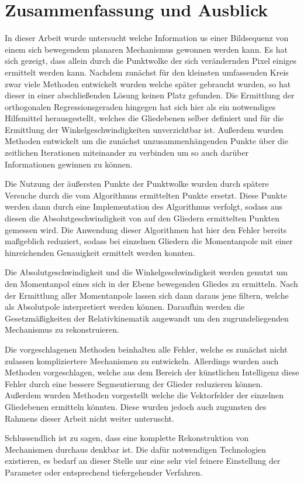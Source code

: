 
\chapter{Zusammenfassung und Ausblick} \label{ch:zusammenfassung_ausblick}


In dieser Arbeit wurde untersucht welche Information us einer Bildsequenz von einem sich bewegendem planaren Mechanismus gewonnen werden kann.
Es hat sich gezeigt, dass allein durch die Punktwolke der sich verändernden Pixel einiges ermittelt werden kann.
Nachdem zunächst für den kleinsten umfassenden Kreis zwar viele Methoden entwickelt wurden welche später gebraucht wurden, so hat dieser in einer abschlie{\ss}enden Lösung keinen Platz gefunden.
Die Ermittlung der orthogonalen Regressionsgeraden hingegen hat sich hier als ein notwendiges Hilfsmittel herausgestellt, welches die Gliedebenen selber definiert und für die Ermittlung der Winkelgeschwindigkeiten unverzichtbar ist.
Au{\ss}erdem wurden Methoden entwickelt um die zunächst unzusammenhängenden Punkte über die zeitlichen Iterationen miteinander zu verbinden um so auch darüber Informationen gewinnen zu können.

Die Nutzung der äu{\ss}ersten Punkte der Punktwolke wurden durch spätere Versuche durch die vom  Algorithmus ermittelten Punkte ersetzt.
Diese Punkte werden dann durch eine Implementation des  Algorithmus verfolgt, sodass aus diesen die Absolutgeschwindigkeit von auf den Gliedern ermittelten Punkten gemessen wird.
Die Anwendung dieser Algorithmen hat hier den Fehler bereits ma{\ss}geblich reduziert, sodass bei einzelnen Gliedern die Momentanpole mit einer hinreichenden Genauigkeit ermittelt werden konnten.

Die Absolutgeschwindigkeit und die Winkelgeschwindigkeit werden genutzt um den Momentanpol eines sich in der Ebene bewegenden Gliedes zu ermitteln.
Nach der Ermittlung aller Momentanpole lassen sich dann daraus jene filtern, welche als Absolutpole interpretiert werden können.
Daraufhin werden die Gesetzmä{\ss}igkeiten der Relativkinematik angewandt um den zugrundeliegenden Mechanismus zu rekonstruieren.

Die vorgeschlagenen Methoden beinhalten alle Fehler, welche es zunächst nicht zulassen kompliziertere Mechanismen zu entwickeln.
Allerdings wurden auch Methoden vorgeschlagen, welche aus dem Bereich der künstlichen Intelligenz diese Fehler durch eine bessere Segmentierung der Glieder reduzieren können.
Au{\ss}erdem wurden Methoden vorgestellt welche die Vektorfelder der einzelnen Gliedebenen ermitteln könnten.
Diese wurden jedoch auch zugunsten des Rahmens dieser Arbeit nicht weiter unteruscht.

Schlussendlich ist zu sagen, dass eine komplette Rekonstruktion von Mechanismen durchaus denkbar ist.
Die dafür notwendigen Technologien existieren, es bedarf an dieser Stelle nur eine sehr viel feinere Einstellung der Parameter oder entsprechend tiefergehender Verfahren.
